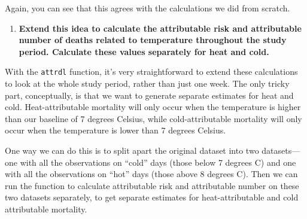 \documentclass[
]{book}
\newenvironment{Shaded}{\begin{snugshade}}{\end{snugshade}}
\newcommand{\AttributeTok}[1]{\textcolor[rgb]{0.77,0.63,0.00}{#1}}
\newcommand{\CommentTok}[1]{\textcolor[rgb]{0.56,0.35,0.01}{\textit{#1}}}
\newcommand{\DecValTok}[1]{\textcolor[rgb]{0.00,0.00,0.81}{#1}}
\newcommand{\FunctionTok}[1]{\textcolor[rgb]{0.00,0.00,0.00}{#1}}
\newcommand{\NormalTok}[1]{#1}
\newcommand{\OtherTok}[1]{\textcolor[rgb]{0.56,0.35,0.01}{#1}}
\newcommand{\SpecialCharTok}[1]{\textcolor[rgb]{0.00,0.00,0.00}{#1}}
\providecommand{\tightlist}{%
  \setlength{\itemsep}{0pt}\setlength{\parskip}{0pt}}
\begin{document}
Again, you can see that this agrees with the calculations we did from scratch.

\begin{enumerate}
\def\labelenumi{\arabic{enumi}.}
\setcounter{enumi}{1}
\tightlist
\item
  \textbf{Extend this idea to calculate the attributable risk and attributable number of deaths related to temperature throughout the study period. Calculate these values separately for heat and cold.}
\end{enumerate}

With the \texttt{attrdl} function, it's very straightforward to extend these calculations to look at the whole study period, rather than just one week. The only tricky part, conceptually, is that we want to generate separate estimates for heat and cold. Heat-attributable mortality will only occur when the temperature is higher than our baseline of 7 degrees Celsius, while cold-attributable mortality will only occur when the temperature is lower than 7 degrees Celsius.

One way we can do this is to split apart the original dataset into two datasets---one with all the observations on ``cold'' days (those below 7 degrees C) and one with all the observations on ``hot'' days (those above 8 degrees C). Then we can run the function to calculate attributable risk and attributable number on these two datasets separately, to get separate estimates for heat-attributable and cold attributable mortality.

\begin{Shaded}
\end{Shaded}
\end{document}
